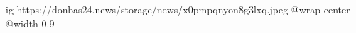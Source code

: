  
 
 
 
 

\ifcmt
  ig https://donbas24.news/storage/news/x0pmpqnyon8g3lxq.jpeg
  @wrap center
  @width 0.9
\fi
